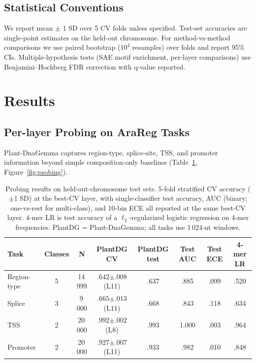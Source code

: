 \documentclass{article}
\begin{document}
\subsection{Statistical Conventions}

We report mean $\pm$ 1 SD over 5 CV folds unless specified. Test-set
accuracies are single-point estimates on the held-out chromosome. For
method-vs-method comparisons we use paired bootstrap ($10^4$ resamples) over
folds and report 95\% CIs. Multiple-hypothesis tests (SAE motif enrichment,
per-layer comparisons) use Benjamini--Hochberg FDR correction with q-value
reported.

\section{Results}

\subsection{Per-layer Probing on AraReg Tasks}
\label{sec:probing}

Plant-DnaGemma captures region-type, splice-site, TSS, and promoter
information beyond simple composition-only baselines
(Table~\ref{tab:probing-main}, Figure~\ref{fig:probing}).

\begin{table}[t]
\centering
\small
\caption{Probing results on held-out-chromosome test sets. 5-fold stratified
CV accuracy ($\pm$1 SD) at the best-CV layer, with single-classifier test
accuracy, AUC (binary; one-vs-rest for multi-class), and 10-bin ECE all
reported at the same best-CV layer. 4-mer LR is test accuracy of a
$\ell_2$-regularized logistic regression on 4-mer frequencies. PlantDG =
Plant-DnaGemma; all tasks use 1\,024-nt windows.}
\label{tab:probing-main}
\begin{tabular}{lccccccc}
\toprule
Task & Classes & N & PlantDG CV & PlantDG test & Test AUC & Test ECE & 4-mer LR \\
\midrule
Region-type & 5 & 14\,999 & $.642{\scriptstyle\pm.008}$ (L11) & .637 & .885 & .099 & .520 \\
Splice      & 3 & 9\,000  & $.665{\scriptstyle\pm.013}$ (L11) & .668 & .843 & .118 & .634 \\
TSS         & 2 & 20\,000 & $.992{\scriptstyle\pm.002}$ (L8)  & .993 & 1.000 & .003 & .964 \\
Promoter    & 2 & 20\,000 & $.927{\scriptstyle\pm.007}$ (L11) & .933 & .982 & .010 & .848 \\
\bottomrule
\end{tabular}
\end{table}
\end{document}
